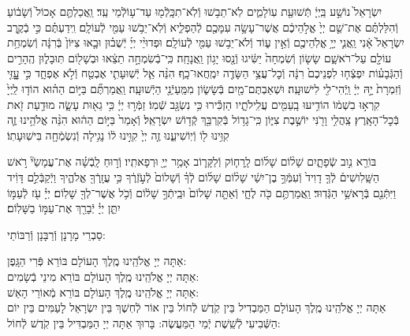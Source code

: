 \documentclass[twoside, openany, parskip=half, 11pt]{book}
\begin{document}
יִשְׂרָאֵל֙ נוֹשַׁ֣ע בַּֽיְיָ֔ תְּֿשׁוּעַ֖ת עֽוֹלָמִ֑ים לֹֽא־תֵב֥שׁוּ וְֿלֹֽא־תִכָּֽלְֿמ֖וּ עַד־ע֥וֹלְֿמֵי עַֽד׃
וַֽאֲכַלְתֶּ֤ם אָכוֹל֙ וְֿשָׂב֔וֹעַ וְֿהִלַּלְתֶּ֗ם אֶת־שֵׁ֤ם יְיָ֙ אֱלֹ֣הֵיכֶ֔ם אֲשֶׁר־עָשָׂ֥ה עִמָּכֶ֖ם לְֿהַפְלִ֑יא וְֿלֹֽא־יֵבֹ֥שׁוּ עַמִּ֖י לְֿעוֹלָֽם׃ וִֽידַעְתֶּ֗ם כִּ֣י בְֿקֶ֤רֶב יִשְׂרָאֵל֙ אָ֔נִי וַֽאֲנִ֛י יְיָ֥ אֱלֹֽהֵיכֶ֖ם וְֿאֵ֣ין ע֑וֹד וְֿלֹא־יֵב֥שׁוּ עַמִּ֖י לְֿעוֹלָֽם׃
וּפְדוּיֵ֨י יְיָ֜ יְֿשֻׁב֗וּן וּבָ֤אוּ צִיּוֹן֙ בְּֿרִנָּ֔ה וְֿשִׂמְחַ֥ת עוֹלָ֖ם עַל־רֹאשָׁ֑ם שָׂשׂ֤וֹן וְֿשִׂמְחָה֙ יַשִּׂ֔יגוּ וְֿנָ֖סוּ יָג֥וֹן וַֽאֲנָחָֽה׃ כִּֽי־בְֿשִׂמְחָ֣ה תֵצֵ֔אוּ וּבְשָׁל֖וֹם תּֽוּבָל֑וּן הֶֽהָרִ֣ים וְֿהַגְּֿבָע֗וֹת יִפְצְֿח֤וּ לִפְנֵיכֶם֙ רִנָּ֔ה וְֿכׇל־עֲצֵ֥י הַשָּׂדֶ֖ה יִמְֽחֲאוּ־כָֽף׃ הִנֵּ֨ה אֵ֧ל יְֿשֽׁוּעָתִ֛י אֶבְטַ֖ח וְֿלֹ֣א אֶפְחָ֑ד כִּ֣י עׇׇׇָזִּ֤י וְֿזִמְרָת֙ יָ֣הּ יְיָ֔ וַֽיְֿהִי־לִ֖י לִישׁוּעָֽה׃ וּשְׁאַבְתֶּם־מַ֖יִם בְּֿשָׂשׂ֑וֹן מִמַּֽעַיְֿנֵ֖י הַיְֿשׁוּעָֽה׃ וַֽאֲמַרְתֶּ֞ם בַּיּ֣וֹם הַה֗וּא הוֹד֤וּ לַֽיְיָ֙ קִרְא֣וּ בִשְׁמ֔וֹ הוֹדִ֥יעוּ בָֽעַמִּ֖ים עֲלִֽילֹתָ֑יו הַזְכִּ֕ירוּ כִּ֥י נִשְׂגָּ֖ב שְֿׁמֽוֹ׃ זַמְּֿר֣וּ יְיָ֔ כִּ֥י גֵא֖וּת עָשָׂ֑ה מוּדַ֥עַת זֹ֖את בְּֿכׇל־הָאָֽרֶץ׃ צַֽהֲלִ֥י וָרֹ֖נִּי יוֹשֶׁ֣בֶת צִיּ֑וֹן כִּֽי־גָד֥וֹל בְּֿקִרְבֵּ֖ךְ קְֿד֥וֹשׁ יִשְׂרָאֵֽל׃ וְֿאָמַר֙ בַּיּ֣וֹם הַה֔וּא הִנֵּ֨ה אֱלֹהֵ֥ינוּ זֶ֛ה קִוִּ֥ינוּ ל֖וֹ וְֿיֽוֹשִׁיעֵ֑נוּ זֶ֤ה יְיָ֙ קִוִּ֣ינוּ ל֔וֹ נָגִ֥ילָה וְֿנִשְׂמְֿחָ֖ה בִּישֽׁוּעָתֽוֹ׃


בּוֹרֵ֖א נִ֣וב שְֿׂפָתָ֑יִם שָׁל֨וֹם שָׁל֜וֹם לָֽרָח֧וֹק וְֿלַקָּר֛וֹב אָמַ֥ר יְיָ֖ וּרְפָאתִֽיו׃ וְֿר֣וּחַ לָֽבְֿשָׁ֗ה אֶת־עֲמָשַׂי֘ רֹ֣אשׁ הַשָּֽׁלִושִׁים֒ לְֿךָ֤ דָוִיד֙ וְֿעִמְּֿךָ֣ בֶן־יִשַׁ֔י שָׁל֨וֹם שָׁל֜וֹם לְֿךָ֗ וְֿשָׁלוֹם֙ לְֿעֹ֣זְֿרֶ֔ךָ כִּ֥י עֲזָֽרְֿךָ֖ אֱלֹהֶ֑יךָ וַיְֿקַבְּֿלֵ֣ם דָּוִ֔יד וַיִּתְּֿנֵ֖ם בְּֿרָאשֵׁ֥י הַגְּֿדֽוּד׃
וַֽאֲמַרְתֶּ֥ם כֹּ֖ה לֶחָ֑י וְֿאַתָּ֤ה שָׁלוֹם֙ וּבֵֽיתְֿךָ֣ שָׁל֔וֹם וְֿכֹ֥ל אֲשֶׁר־לְךָ֖ שָׁלֽוֹם׃ יְיָ֗ עֹ֖ז לְֿעַמּ֣וֹ יִתֵּ֑ן יְיָ֓ יְֿבָרֵ֖ךְ אֶת־עַמּ֣וֹ בַשָּׁלֽוֹם׃

\nextpage


\begin{scriptsize}
סַבְרֵי מָרָנָן וְֿרַבָּנָן וְֿרַבּוֹתַי: \\
\end{scriptsize}
אַתָּה יְיָ אֱלֹהֵֽינוּ מֶֽלֶךְ הָעוֹלָם בּוֹרֵא פְּֿרִי הַגָּֽפֶן: \\
אַתָּה יְיָ אֱלֹהֵֽינוּ מֶֽלֶךְ הָעוֹלָם
בּוֹרֵא מִינֵי בְֿשָׂמִים: \\
אַתָּה יְיָ אֱלֹהֵֽינוּ מֶֽלֶךְ הָעוֹלָם בּוֹרֵא מְֿאוֹרֵי הָאֵשׁ:\\
אַתָּה יְיָ אֱלֹהֵֽינוּ מֶֽלֶךְ הָעוֹלָם הַמַּבְדִיל בֵּין קֹֽדֶשׁ לְֿחוֹל בֵּין אוֹר לְֿחֽשֶׁךְ בֵּין יִשְׂרָאֵל לָעַמִּים בֵּין יוֹם הַשְּֿׁבִיעִי לְֿשֵֽׁשֶׁת יְֿמֵי הַמַּעֲשֶׂה: בָּרוּךְ אַתָּה יְיָ הַמַּבְדִּיל בֵּין קֹֽדֶשׁ לְֿחוֹל:
\end{document}
